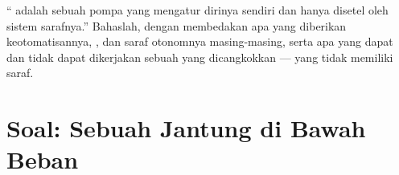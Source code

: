 \begin{exercise}[$\star\star\star$]\label{exo:b2:heart:12}
`` adalah sebuah pompa yang mengatur dirinya sendiri dan hanya
disetel oleh sistem sarafnya.'' Bahaslah, dengan membedakan apa yang
diberikan keotomatisannya, , dan saraf otonomnya
masing-masing, serta apa yang dapat dan tidak dapat dikerjakan sebuah
 yang dicangkokkan --- yang tidak memiliki saraf.
\end{exercise}

\section{Soal: Sebuah Jantung di Bawah Beban}

